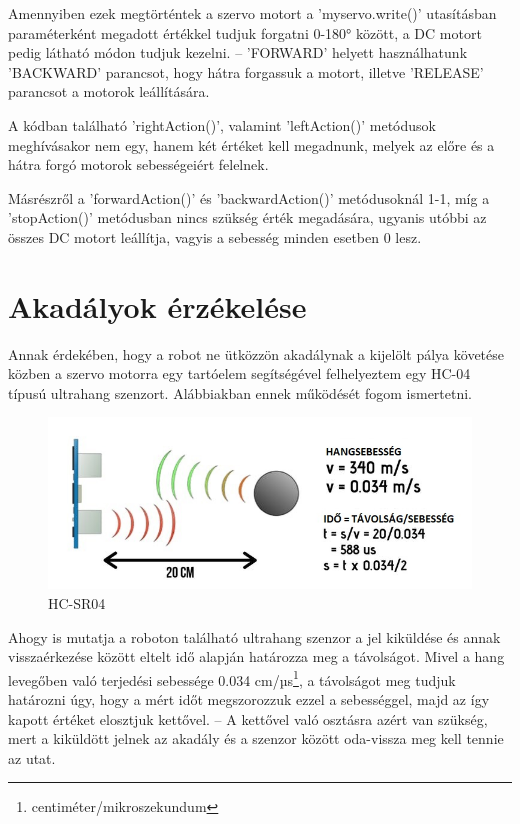 \documentclass[]{thesis-ekf}
\theoremstyle{definition}
\begin{document}
Amennyiben ezek megtörténtek a szervo motort a 'myservo.write()' utasításban paraméterként megadott értékkel tudjuk forgatni 0-180° között, a DC motort pedig  látható módon tudjuk kezelni. -- 'FORWARD' helyett használhatunk 'BACKWARD' parancsot, hogy hátra forgassuk a motort, illetve 'RELEASE' parancsot a motorok leállítására. 

A kódban található 'rightAction()', valamint 'leftAction()' metódusok meghívásakor nem egy, hanem két értéket kell megadnunk, melyek az előre és a hátra forgó motorok sebességeiért felelnek.

Másrészről a 'forwardAction()' és 'backwardAction()' metódusoknál 1-1, míg a 'stopAction()' metódusban nincs szükség érték megadására, ugyanis utóbbi az összes DC motort leállítja, vagyis a sebesség minden esetben 0 lesz.

\section{Akadályok érzékelése}
Annak érdekében, hogy a robot ne ütközzön akadálynak a kijelölt pálya követése közben a szervo motorra egy tartóelem segítségével felhelyeztem egy HC-04 típusú ultrahang szenzort. Alábbiakban ennek működését fogom ismertetni.
\begin{figure} [!h]
	\includegraphics[width=\columnwidth]{images/ultrasonic}
	\caption{HC-SR04}
	\label{ultrahang}
\end{figure}

Ahogy  is mutatja a roboton található ultrahang szenzor a jel kiküldése és annak visszaérkezése között eltelt idő alapján határozza meg a távolságot\cite{Ultrahang_Szenzor}. Mivel a hang levegőben való terjedési sebessége 0.034 cm/µs\footnote{centiméter/mikroszekundum}, a távolságot meg tudjuk határozni úgy, hogy a mért időt megszorozzuk ezzel a sebességgel, majd az így kapott értéket elosztjuk kettővel. -- A kettővel való osztásra azért van szükség, mert a kiküldött jelnek az akadály és a szenzor között oda-vissza meg kell tennie az utat.
\end{document}
